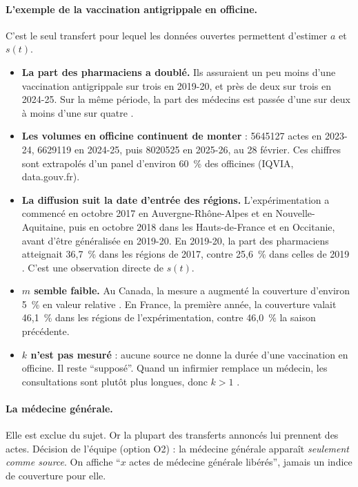 \documentclass[11pt]{article}
\begin{document}
\paragraph{L'exemple de la vaccination antigrippale en officine.}
C'est le seul transfert pour lequel les données ouvertes permettent d'estimer $a$ et $s(t)$.
\begin{itemize}
  \item \textbf{La part des pharmaciens a doublé.} Ils assuraient un peu moins d'une vaccination antigrippale sur
    trois en 2019-20, et près de deux sur trois en 2024-25\mesure{}. Sur la même période, la part des médecins est
    passée d'une sur deux à moins d'une sur quatre \citep{ccomptes2026}.
  \item \textbf{Les volumes en officine continuent de monter} : \num{5645127} actes en 2023-24, \num{6629119} en
    2024-25, puis \num{8020525} en 2025-26, au 28 février\mesure{}. Ces chiffres sont extrapolés d'un panel d'environ
    60~\% des officines (IQVIA, data.gouv.fr).
  \item \textbf{La diffusion suit la date d'entrée des régions.} L'expérimentation a commencé en octobre 2017 en
    Auvergne-Rhône-Alpes et en Nouvelle-Aquitaine, puis en octobre 2018 dans les Hauts-de-France et en Occitanie,
    avant d'être généralisée en 2019-20. En 2019-20, la part des pharmaciens atteignait 36,7~\%\mesure{} dans les
    régions de 2017, contre 25,6~\%\mesure{} dans celles de 2019 \citep{liard2022}. C'est une observation directe de
    $s(t)$.
  \item \textbf{$m$ semble faible.} Au Canada, la mesure a augmenté la couverture d'environ 5~\%\mesure{} en valeur
    relative \citep{buchan2017}. En France, la première année, la couverture valait 46,1~\%\mesure{} dans les
    régions de l'expérimentation, contre 46,0~\% la saison précédente.
  \item \textbf{$k$ n'est pas mesuré} : aucune source ne donne la durée d'une vaccination en officine. Il reste
    \enquote{supposé}. Quand un infirmier remplace un médecin, les consultations sont plutôt plus longues, donc
    $k>1$ \citep{laurant2018}.
\end{itemize}

\paragraph{La médecine générale.} Elle est exclue du sujet. Or la plupart des transferts annoncés lui prennent des
actes. Décision de l'équipe (option O2) : la médecine générale apparaît \emph{seulement comme source}. On affiche
\enquote{$x$ actes de médecine générale libérés}, jamais un indice de couverture pour elle.
\end{document}
